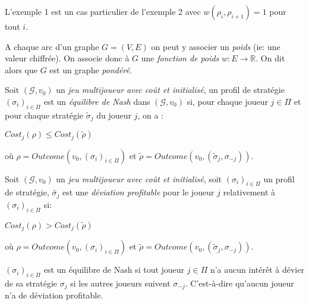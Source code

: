 \begin{rem}
	L'exemple 1 est un cas particulier de l'exemple 2 avec $w(\rho_{i},\rho_{i+1}) = 1$ pour tout $i$.
\end{rem}

\begin{defi}
	\label{def:fonctionPoids}
	A chaque arc d'un graphe $G = (V,E)$ on peut y associer un \textit{poids} (ie: une valeur chiffrée). On associe donc à $G$ une \textit{fonction de poids}  $w : E \rightarrow \mathbb{R}$. On dit alors que $G$ est un graphe \textit{pondéré}.
\end{defi}





\begin{defi}
	
	Soit $(\mathcal{G}, v_{0})$ un \textit{jeu multijoueur avec coût et initialisé}, un profil de stratégie $(\sigma _{i})_{i \in \Pi}$ est un \textit{équilibre de Nash} dans $(\mathcal{G}, v_{0})$ si, pour chaque joueur $j \in \Pi$ et pour chaque stratégie $\tilde{\sigma}_{j}$ du joueur $j$, on a :
	\begin{center}$ Cost_{j}(\rho) \leq Cost_{j}(\tilde{\rho})$ \end{center}
	où $\rho = Outcome(v_{0},(\sigma _{i})_{i \in \Pi})$ et $\tilde{\rho} = Outcome(v_{0}, (\tilde{\sigma} _{j} ,\sigma _{-j}))$.
\end{defi}	



\begin{defi}
	
	Soit $(\mathcal{G}, v_{0})$ un \textit{jeu multijoueur avec coût et initialisé}, soit $(\sigma _{i})_{i \in \Pi}$ un profil de stratégie, $\tilde{\sigma _{j}}$ est une \textit{déviation profitable} pour le joueur $j$ relativement à $(\sigma _{i})_{i \in \Pi}$ si:
	\begin{center} $ Cost_{j}(\rho) > Cost_{j}(\tilde{\rho})$ \end{center}
	où $\rho = Outcome(v_{0},(\sigma _{i})_{i \in \Pi})$ et $\tilde{\rho} = Outcome(v_{0}, (\tilde{\sigma} _{j} ,\sigma _{-j}))$. 
\end{defi}

\begin{rem}
	$(\sigma _{i})_{i\in \Pi}$ est un équilibre de Nash si tout joueur $j \in \Pi$ n'a aucun intérêt à dévier de sa stratégie $\sigma _{j}$ si les autres joueurs suivent $\sigma _{-j}$. C'est-à-dire qu'aucun joueur n'a de déviation profitable. 
\end{rem}

